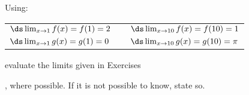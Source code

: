 {\noindent Using:

\begin{tabular}{lll}
$\ds \lim_{x\to1}f(x) = f(1) = 2$ & \quad\quad &$\ds \lim_{x\to10} f(x) = f(10) = 1$\\
$\ds \lim_{x\to1}g(x) = g(1) = 0$ &  & $\ds \lim_{x\to10} g(x) = g(10) = \pi$
\end{tabular}

\noindent evaluate the limits given in Exercises}
{, where possible. If it is not possible to know, state so.}

